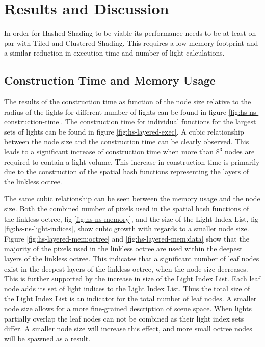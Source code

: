 \section{Results and Discussion}

In order for Hashed Shading to be viable its performance needs to be at least on par
with Tiled and Clustered Shading. This requires a low memory footprint and a similar
reduction in execution time and number of light calculations.



\subsection{Construction Time and Memory Usage}

The results of the construction time as function of the node size relative to the radius
of the lights for different number of lights can be found in
figure \ref{fig:hs-ns-construction-time}. The construction time for individual functions
for the largest sets of lights can be found in figure \ref{fig:hs-layered-exec}. A cubic
relationship between the node size and the construction time can be
clearly observed. This leads to a  significant increase of construction time when more
than $8^3$ nodes are required to contain a light volume.
This increase in construction time is primarily due to the construction of the spatial
hash functions representing the layers of the linkless octree.

The same cubic relationship can be seen between the memory usage and the node size. Both the
combined number  of pixels used in the spatial hash functions of the linkless octree,
fig \ref{fig:hs-ns-memory}, and the size of the Light Index List, fig \ref{fig:hs-ns-light-indices},
show cubic growth with regards to a smaller node size. Figure \ref{fig:hs-layered-mem:octree}
and \ref{fig:hs-layered-mem:data} show that
the majority of the pixels used in the linkless octree
are used within the deepest layers of the linkless octree. This indicates that
a significant number of leaf nodes exist in the deepest layers of the linkless octree,
when the node size decreases. This is further supported by the increase in size of the Light
Index List. Each leaf node adds its set of light indices to the Light Index List. Thus the
total size of the Light Index List is an indicator for the total number of leaf nodes.
A smaller node size allows for a more fine-grained description of scene space. When lights
partially overlap the leaf nodes can not be combined as their light index sets differ. A
smaller node size will increase this effect, and more small octree nodes will be spawned
as a result.

